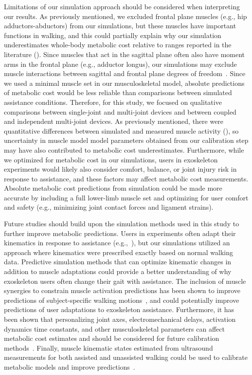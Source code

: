 \documentclass[10pt,letterpaper]{article}
\begin{document}
Limitations of our simulation approach should be considered when interpreting our results. As previously mentioned, we excluded frontal plane muscles (e.g., hip adductors-abductors) from our simulations, but these muscles have important functions in walking, and this could partially explain why our simulation underestimates whole-body metabolic cost relative to ranges reported in the literature (). Since muscles that act in the sagittal plane often also have moment arms in the frontal plane (e.g., adductor longus), our simulations may exclude muscle interactions between sagittal and frontal plane degrees of freedom~\cite{Dembia:2017}. Since we used a minimal muscle set in our musculoskeletal model, absolute predictions of metabolic cost would be less reliable than comparisons between simulated assistance conditions. Therefore, for this study, we focused on qualitative comparisons between single-joint and multi-joint devices and between coupled and independent multi-joint devices. As previously mentioned, there were quantitative differences between simulated and measured muscle activity (), so uncertainty in muscle model model parameters obtained from our calibration step may have also contributed to metabolic cost underestimates. Furthermore, while we optimized for metabolic cost in our simulations, users in exoskeleton experiments would likely also consider comfort, balance, or joint injury risk in response to assistance, and these factors may affect metabolic cost measurements. Absolute metabolic cost predictions from simulation could be made more accurate by including a full lower-limb muscle set and optimizing for user comfort and safety (e.g., minimizing joint contact forces and ligament strains).

Future studies should build upon the simulation methods used in this study to further improve metabolic predictions. Users in experiments often adapt their kinematics in response to assistance (e.g.,~\cite{Gordon:2018, Collins:2015, Quinlivan:2017, Panizzolo:2016, Jackson:2015, Galle:2017, Koller:2015}), but our simulations utilized an approach where kinematics were prescribed exactly based on normal walking data. Predictive simulation methods that can optimize kinematic changes in addition to muscle adaptations could provide a better understanding of why exoskeleton users often change their gait with assistance. The inclusion of muscle synergies to constrain muscle activation predictions has been shown to improve predictions of subject-specific walking motions~\cite{Meyer:2016}, and could potentially improve predictions of user adaptations to exoskeleton assistance. Furthermore, it has been shown that personalizing joint axes, electromechanical delays, activation dynamics time constants, and other musculoskeletal  parameters can affect metabolic cost estimates and should be considered for future calibration methods~\cite{Arones:2020}. Finally, muscle kinematic states estimated from ultrasound measurements for both assisted and unassisted walking could be used to calibrate metabolic models and improve predictions~\cite{Nuckols:2020}.
\end{document}
